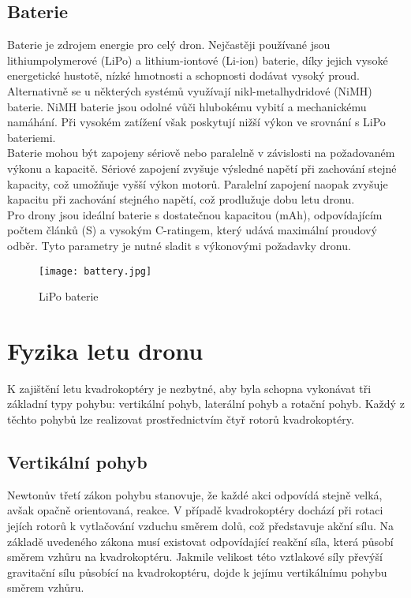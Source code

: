\documentclass[12pt]{report}
\begin{document}
\section{Baterie}

Baterie je zdrojem energie pro celý dron. Nejčastěji používané jsou lithiumpolymerové (LiPo) a lithium-iontové (Li-ion) baterie, díky jejich vysoké energetické hustotě, nízké hmotnosti a schopnosti dodávat vysoký proud. Alternativně se u některých systémů využívají nikl-metalhydridové (NiMH) baterie. NiMH baterie jsou odolné vůči hlubokému vybití a mechanickému namáhání. Při vysokém zatížení však poskytují nižší výkon ve srovnání s LiPo bateriemi.\\
Baterie mohou být zapojeny sériově nebo paralelně v závislosti na požadovaném výkonu a kapacitě. Sériové zapojení zvyšuje výsledné napětí při zachování stejné kapacity, což umožňuje vyšší výkon motorů. Paralelní zapojení naopak zvyšuje kapacitu při zachování stejného napětí, což prodlužuje dobu letu dronu.\\
Pro drony jsou ideální baterie s dostatečnou kapacitou (mAh), odpovídajícím počtem článků (S) a vysokým C-ratingem, který udává maximální proudový odběr. Tyto parametry je nutné sladit s výkonovými požadavky dronu. \cite{mainbook}

\begin{figure}[H]
	\centering
	\texttt{[image: battery.jpg]}
	\caption{LiPo baterie \cite{dojo}}
	\label{fig:battery.jpg}
\end{figure}

\chapter{Fyzika letu dronu}
K zajištění letu kvadrokoptéry je nezbytné, aby byla schopna vykonávat tři základní typy pohybu: vertikální pohyb, laterální pohyb a rotační pohyb. Každý z těchto pohybů lze realizovat prostřednictvím čtyř rotorů kvadrokoptéry.

\section{Vertikální pohyb}
Newtonův třetí zákon pohybu stanovuje, že každé akci odpovídá stejně velká, avšak opačně orientovaná, reakce. V případě kvadrokoptéry dochází při rotaci jejích rotorů k vytlačování vzduchu směrem dolů, což představuje akční sílu. Na základě uvedeného zákona musí existovat odpovídající reakční síla, která působí směrem vzhůru na kvadrokoptéru. Jakmile velikost této vztlakové síly převýší gravitační sílu působící na kvadrokoptéru, dojde k jejímu vertikálnímu pohybu směrem vzhůru.
\end{document}

